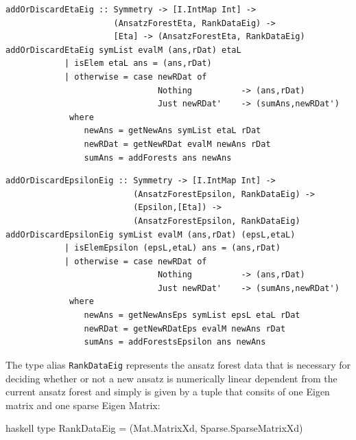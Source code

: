\documentclass[a4paper,12pt, DIV=14, BCOR=5mm, twoside, headsepline]{scrbook}
\begin{document}
\begin{samepage}
\begin{verbatim}
addOrDiscardEtaEig :: Symmetry -> [I.IntMap Int] ->
                      (AnsatzForestEta, RankDataEig) -> 
                      [Eta] -> (AnsatzForestEta, RankDataEig)
addOrDiscardEtaEig symList evalM (ans,rDat) etaL
            | isElem etaL ans = (ans,rDat)
            | otherwise = case newRDat of
                               Nothing          -> (ans,rDat)
                               Just newRDat'    -> (sumAns,newRDat')
             where
                newAns = getNewAns symList etaL rDat
                newRDat = getNewRDat evalM newAns rDat
                sumAns = addForests ans newAns
\end{verbatim} 
\end{samepage}

\begin{samepage}
\begin{verbatim}
addOrDiscardEpsilonEig :: Symmetry -> [I.IntMap Int] ->
                          (AnsatzForestEpsilon, RankDataEig) ->
                          (Epsilon,[Eta]) ->
                          (AnsatzForestEpsilon, RankDataEig)
addOrDiscardEpsilonEig symList evalM (ans,rDat) (epsL,etaL)
            | isElemEpsilon (epsL,etaL) ans = (ans,rDat)
            | otherwise = case newRDat of
                               Nothing          -> (ans,rDat)
                               Just newRDat'    -> (sumAns,newRDat')
             where
                newAns = getNewAnsEps symList epsL etaL rDat
                newRDat = getNewRDatEps evalM newAns rDat
                sumAns = addForestsEpsilon ans newAns
\end{verbatim} 
\end{samepage}

The type alias \texttt{RankDataEig} represents the ansatz forest data that is necessary for deciding whether or not a new ansatz is numerically linear dependent from the current ansatz forest and simply is given by a tuple that consits of one Eigen matrix and one sparse Eigen Matrix:

\begin{center}
\begin{cminted}{haskell}
type RankDataEig = (Mat.MatrixXd, Sparse.SparseMatrixXd)
\end{cminted}
\end{center}
\end{document}
